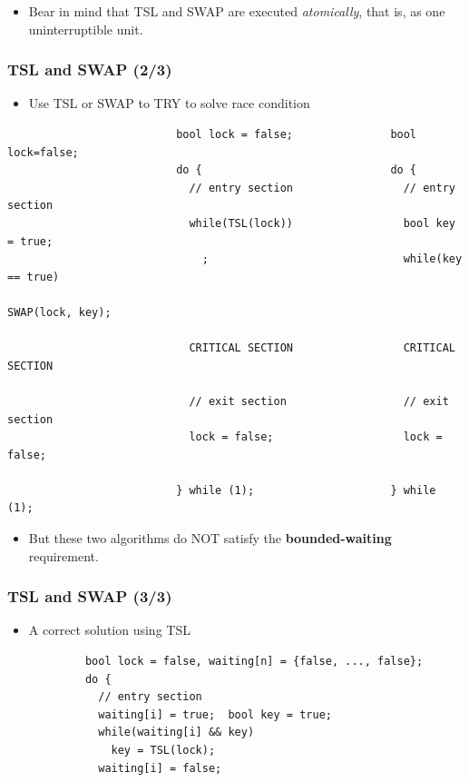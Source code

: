 \documentclass[CJKutf8,xcolor=pdftex,dvipsnames,table]{beamer}
\begin{document}
\begin{CJK*}{UTF8}{song}
\begin{frame}[fragile]
  \pause

  \begin{itemize}
  \item{Bear in mind that TSL and SWAP are executed \emph{atomically}, that is, as one uninterruptible unit.}
  \end{itemize}
\end{frame}

  \begin{frame}[fragile]
  \frametitle{TSL and SWAP (2/3)} \pause
  \begin{itemize}
  \item{Use TSL or SWAP to TRY to solve race condition} \pause
  \end{itemize}

\begin{lstlisting}
						  bool lock = false;               bool lock=false;
						  do {                             do {
						    // entry section                 // entry section
						    while(TSL(lock))                 bool key = true;
						      ;                              while(key == true)
						                                       SWAP(lock, key);

						    CRITICAL SECTION                 CRITICAL SECTION

						    // exit section                  // exit section
						    lock = false;                    lock = false;

						  } while (1);                     } while (1);
\end{lstlisting}

  \pause

  \begin{itemize}
  \item{But these two algorithms do NOT satisfy the \textbf{bounded-waiting} requirement.}
  \end{itemize}
\end{frame}

  \begin{frame}[fragile]
  \frametitle{TSL and SWAP (3/3)} \pause
  \begin{itemize}
  \item{A correct solution using TSL} \pause
  \end{itemize}

\begin{lstlisting}
            bool lock = false, waiting[n] = {false, ..., false};
            do {
              // entry section
              waiting[i] = true;  bool key = true;
              while(waiting[i] && key)
                key = TSL(lock);
              waiting[i] = false;


\end{lstlisting}
\end{frame}
\end{CJK*}
\end{document}
